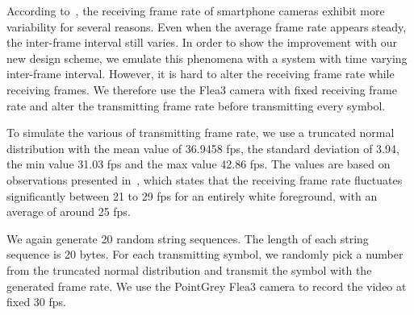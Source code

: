 According to~\cite{hu2013lightsync}, the receiving frame rate of smartphone cameras exhibit more variability for several reasons. Even when the average frame rate appears steady, the inter-frame interval still varies. 
In order to show the improvement with our new design scheme, we emulate this phenomena with a system with time varying inter-frame interval. 
However, it is hard to alter the receiving frame rate while receiving frames. We therefore use the Flea3 camera with fixed receiving frame rate and alter the transmitting frame rate before transmitting every symbol. 

To simulate the various of transmitting frame rate, we use a truncated normal distribution with the mean value of 36.9458 fps, the standard deviation of 3.94, the min value 31.03 fps and the max value 42.86 fps. The values are based on observations presented in~\cite{hu2013lightsync}, which states that the receiving frame rate fluctuates significantly between 21 to 29 fps for an entirely white foreground, with an average of around 25 fps. 

We again generate 20 random string sequences. The length of each string sequence is 20 bytes. For each transmitting symbol, we randomly pick a number from the truncated normal distribution and transmit the symbol with the generated frame rate.
We use the PointGrey Flea3 camera to record the video at fixed 30 fps. 


